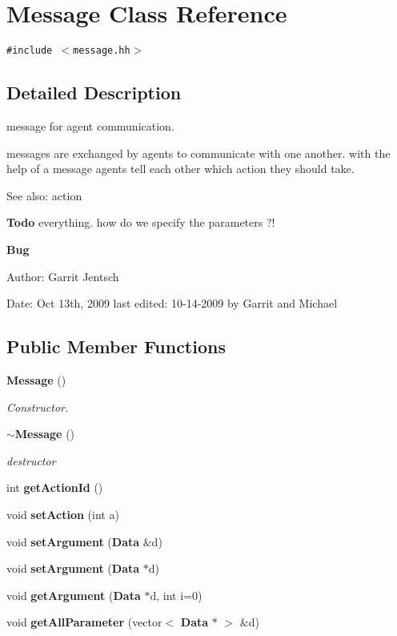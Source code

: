 \section{Message Class Reference}
\label{classMessage}
{\tt \#include $<$message.hh$>$}



\subsection{Detailed Description}
message for agent communication. 

messages are exchanged by agents to communicate with one another. with the help of a message agents tell each other which action they should take.

\begin{Desc}
\item[See also:]action\end{Desc}
\begin{Desc}
\item[{\bf Todo}]everything. how do we specify the parameters ?!\end{Desc}
\begin{Desc}
\item[{\bf Bug}]\end{Desc}
\begin{Desc}
\item[Author:]Garrit Jentsch\end{Desc}
\begin{Desc}
\item[Date:]Oct 13th, 2009 last edited: 10-14-2009 by Garrit and Michael \end{Desc}
\subsection*{Public Member Functions}
\begin{CompactItemize}
\item 
{\bf Message} ()
\begin{CompactList}\small\item\em Constructor. \item\end{CompactList}\item 
{\bf $\sim$Message} ()
\begin{CompactList}\small\item\em destructor \item\end{CompactList}\item 
int {\bf getActionId} ()
\item 
void {\bf setAction} (int a)
\item 
void {\bf setArgument} ({\bf Data} \&d)
\item 
void {\bf setArgument} ({\bf Data} $\ast$d)
\item 
void {\bf getArgument} ({\bf Data} $\ast$d, int i=0)
\item 
void {\bf getAllParameter} (vector$<$ {\bf Data} $\ast$ $>$ \&d)
\end{CompactItemize}


